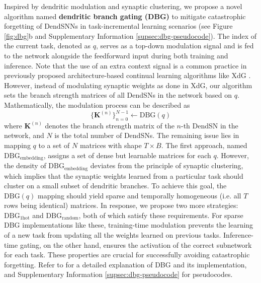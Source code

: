 Inspired by dendritic modulation and synaptic clustering, we propose a novel algorithm named \textbf{dendritic branch gating (DBG)} to mitigate catastrophic forgetting of DendSNNs in task-incremental learning scenarios (see Figure \ref{fig:dbg}b and Supplementary Information \ref{supsec:dbg-pseudocode}). The index of the current task, denoted as $q$, serves as a top-down modulation signal and is fed to the network alongside the feedforward input during both training and inference. Note that the use of an extra context signal is a common practice in previously proposed architecture-based continual learning algorithms like XdG \cite{masse2018xdg}. However, instead of modulating synaptic weights as done in XdG, our algorithm sets the branch strength matrices of all DendSNs in the network based on $q$. Mathematically, the modulation process can be described as
\begin{equation}\label{eq:dbg-overall}
  \{\mathbf{K}^{(n)}\}_{n=0}^{N-1} \leftarrow \mathrm{DBG}(q)
\end{equation}
where $\mathbf{K}^{(n)}$ denotes the branch strength matrix of the $n$-th DendSN in the network, and $N$ is the total number of DendSNs. The remaining issue lies in mapping $q$ to a set of $N$ matrices with shape $T \times B$. The first approach, named $\mathrm{DBG}_{\mathrm{embedding}}$, assigns a set of dense but learnable matrices for each $q$. However, the density of $\mathrm{DBG}_{\mathrm{embedding}}$ deviates from the principle of synaptic clustering, which implies that the synaptic weights learned from a particular task should cluster on a small subset of dendritic branches. To achieve this goal, the $\mathrm{DBG}(q)$ mapping should yield sparse and temporally homogeneous (i.e. all $T$ rows being identical) matrices. In response, we propose two more strategies: $\mathrm{DBG}_{\mathrm{1hot}}$ and $\mathrm{DBG}_{\mathrm{random}}$, both of which satisfy these requirements. For sparse DBG implementations like these, training-time modulation prevents the learning of a new task from updating all the weights learned on previous tasks. Inference-time gating, on the other hand, ensures the activation of the correct subnetwork for each task. These properties are crucial for successfully avoiding catastrophic forgetting. Refer to  for a detailed explanation of DBG and its implementation, and Supplementary Information \ref{supsec:dbg-pseudocode} for pseudocodes.

